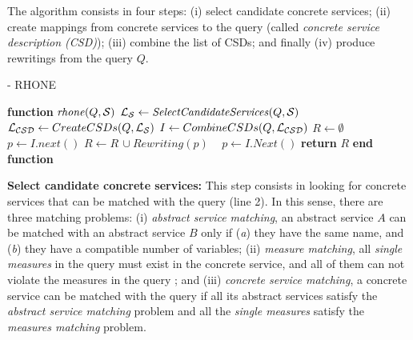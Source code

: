 The algorithm consists in four steps: (i) select candidate concrete services; (ii)
create mappings from concrete services to the query (called \textit{concrete
service description (CSD)}); (iii) combine the list of CSDs; and finally (iv)
produce rewritings from the query $Q$.


\begin{algorithm}
\caption{ - RHONE}
\label{algo-rhone}

\begin{algorithmic}[1]
 
\STATE \textbf{function} $\mathit{rhone} (Q, \bigS)$
 \STATE  $\bigLS \leftarrow \mathit{SelectCandidateServices}(Q, \bigS)$ \label{rhone:buildPCD}
 \STATE  $\bigLCSD \leftarrow CreateCSDs(Q, \bigLS)$
 \STATE  $I \leftarrow CombineCSDs(Q, \bigLCSD)$
 \STATE $R\leftarrow \emptyset$
    \STATE $p \leftarrow I.next()$
  \STATE $R\leftarrow R\,\cup \mathit{Rewriting}(p)$
  \STATE ~\!
   \ENDIF
      \STATE $p \leftarrow I.\mathit{Next}()$
 \ENDWHILE
    \STATE \textbf{return} $R$
\STATE \textbf{end function}

\end{algorithmic}

\end{algorithm}


\noindent \textbf{Select candidate concrete services:} This step consists in
 looking for concrete services that can be matched with the query (line 2). In
 this sense, there are three matching problems: 
 (i) \textit{abstract service matching}, an abstract service $A$ can be
 matched with an abstract service $B$ only if (\textit{a}) they have the same
 name, and (\textit{b}) they have a compatible number of variables;
 (ii) \textit{measure matching}, all \textit{single measures} in the query must
 exist in the concrete service, and all of them can not violate the measures in
 the query ; and 
 (iii) \textit{concrete service matching}, a concrete service can
 be matched with the query if all its abstract services satisfy the \textit{abstract service
 matching} problem and all the \textit{single measures} satisfy the \textit{measures matching} problem.
 

